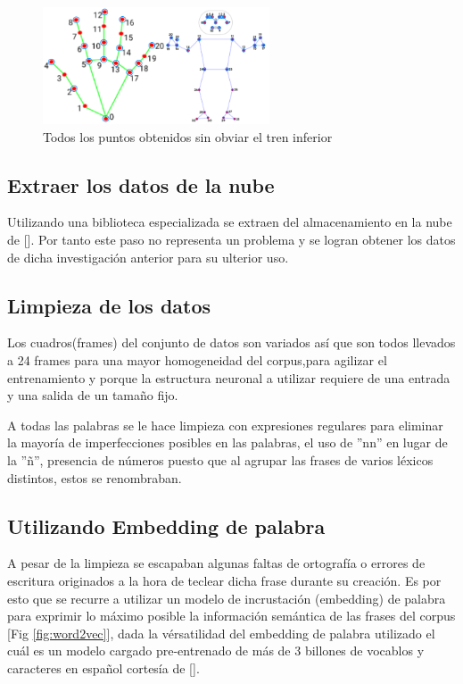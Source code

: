\begin{figure}[ht!]
    \centering
    \includegraphics[width=0.6\textwidth]{Graphics/points.png}
    \caption{Todos los puntos obtenidos sin obviar el tren inferior}
    \label{fig:points}
\end{figure}
\subsection{Extraer los datos de la nube}
Utilizando una biblioteca especializada se extraen del almacenamiento en la nube de [\cite{leynier-lsc-2021}]. Por tanto este paso no representa un problema y se logran obtener los datos de dicha investigación anterior para su ulterior uso.
\subsection{Limpieza de los datos}
Los cuadros(frames) del conjunto de datos son variados así que son todos llevados a 24 frames para una mayor homogeneidad del corpus,para agilizar el entrenamiento y porque la estructura neuronal a utilizar requiere de una entrada y una salida de un tamaño fijo.

 A todas las palabras se le hace limpieza con expresiones regulares para eliminar la mayoría de imperfecciones posibles en las palabras, el uso de ''nn'' en lugar de la ''ñ'', presencia de números puesto que al agrupar las frases de varios léxicos distintos, estos se renombraban.
 
 \subsection{Utilizando Embedding de palabra} 
 A pesar de la limpieza se escapaban algunas faltas de ortografía o errores de escritura originados a la hora de teclear dicha frase durante su creación. Es por esto que se recurre a utilizar un modelo de incrustación (embedding) de palabra para exprimir lo máximo posible la información semántica de las frases del corpus [Fig \ref{fig:word2vec}], dada la vérsatilidad del embedding de palabra utilizado el cuál es un modelo cargado pre-entrenado de más de 3 billones de vocablos y caracteres en español cortesía de [\cite{aitor_almeida_2018_1410403}].



